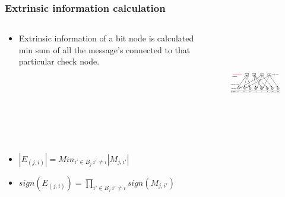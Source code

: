 \documentclass[xcolor=dvipsname]
{beamer}
\begin{document}
\begin{frame}[t]
\frametitle{ Extrinsic information calculation }  
\vspace{-5mm}
\begin{columns}[totalwidth=\textwidth]
	\begin{column}{0.3\textwidth}
	\centering
	\begin{itemize}
	\item Extrinsic information of a bit node is calculated min sum of all the message's connected to 
	that particular check node. 	
	\end{itemize}
 
			
	\end{column}%
	   		
	\begin{column}{0.7\textwidth}
	\centering
	\begin{figure}
	\includegraphics[height=4.5cm,width=8cm]{minSum4}
	\end{figure}
	\end{column}%
\end{columns}

\begin{itemize}

\item \alert{$|E_{(j,i)}| =  Min_{i'\in B_j \ i'\neq i }|M_{j,i'}|   $ }
\item \alert{$sign({E_{(j,i)}}) =  \prod_{i'\in B_j \ i'\neq i }sign(M_{j,i'})   $ }
\end{itemize}
\end{frame}
\end{document}
